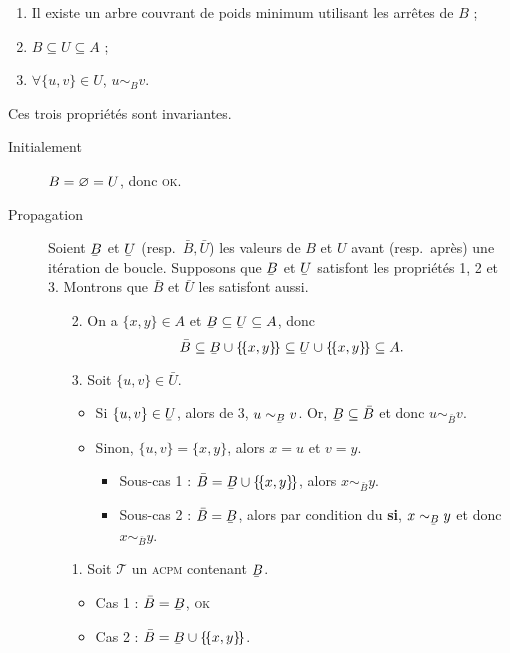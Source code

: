 \begin{prv}
	\begin{enumerate}
		\item Il existe un arbre couvrant de poids minimum utilisant les arrêtes de $B$ ;
		\item $B \subseteq U \subseteq A$\/ ;
		\item $\forall \{u,v\} \in U$, $u \sim_B v$.
	\end{enumerate}
	Ces trois propriétés sont invariantes.
	\begin{description}
		\item[Initialement] $B = \varnothing = U$, donc \textsc{ok}.
		\item[Propagation] Soient $\ubar{B}$\/ et $\ubar{U}$\/ (resp.\ $\bar{B}, \bar{U}$) les valeurs de $B$\/ et $U$\/ avant (resp.\ après) une itération de boucle. Supposons que $\ubar{B}$\/ et $\ubar{U}$\/ satisfont les propriétés 1, 2 et 3. Montrons que $\bar{B}$\/ et $\bar{U}$\/ les satisfont aussi.
			\begin{enumerate}
				\item[2.] On a $\{x,y\} \in A$\/ et $\ubar{B} \subseteq \ubar{U} \subseteq A$, donc \[
						\bar{B} \subseteq \ubar{B} \cup \{\!\{x,y\}\!\} \subseteq \ubar{U} \cup \{\!\{x,y\}\!\} \subseteq A
					.\]
				\item[3.] Soit $\{u,v\} \in \bar{U}$.
					\begin{itemize}
						\item Si $\{u,v\} \in \ubar{U}$, alors de 3, $u \sim_{\ubar{B}} v$. Or, $\ubar{B} \subseteq \bar{B}$\/ et donc $u \sim_{\bar{B}} v$.
						\item Sinon, $\{ u,v\} = \{x,y\}$, alors $x = u$\/ et $v = y$.
							\begin{itemize}
								\item Sous-cas 1 : $\bar{B} = \ubar{B} \cup \{\!\{x,y\}\!\}$, alors $x \sim_{\bar{B}} y$.
								\item Sous-cas 2 : $\bar{B} = \ubar{B}$, alors par condition du \textbf{si}, $x \sim_{\ubar{B}} y$\/ et donc $x \sim_{\bar{B}} y$.
							\end{itemize}
					\end{itemize}
				\item[1.]
					Soit $\mathcal{T}$\/ un \textsc{acpm} contenant $\ubar{B}$.
					\begin{itemize}
						\item Cas 1 : $\bar{B} = \ubar{B}$, \textsc{ok}
						\item Cas 2 : $\bar{B} = \ubar{B} \cup \{\!\{x,y\}\!\}$.

\end{itemize}
\end{enumerate}
\end{description}
\end{prv}
